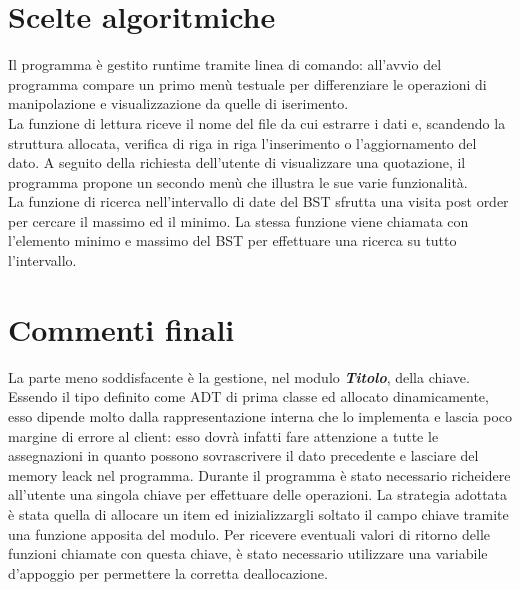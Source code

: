 \documentclass[11pt, a4paper, oneside, titlepage]{article}
\begin{document}
    
    \section{Scelte algoritmiche}
    Il programma è gestito runtime tramite linea di comando: all'avvio del programma compare un primo menù testuale per differenziare le operazioni 
    di manipolazione e visualizzazione da quelle di iserimento.\\
    La funzione di lettura riceve il nome del file da cui estrarre i dati e, scandendo la struttura allocata, verifica di riga in riga l'inserimento o l'aggiornamento del dato.
    A seguito della richiesta dell'utente di visualizzare una quotazione, il programma propone un secondo menù che illustra le sue varie funzionalità.\\
    La funzione di ricerca nell'intervallo di date del BST sfrutta una visita post order per cercare il massimo ed il minimo. 
    La stessa funzione viene chiamata con l'elemento minimo e massimo del BST per effettuare una ricerca su tutto l'intervallo.


    \section{Commenti finali}
    La parte meno soddisfacente è la gestione, nel modulo \textbf{\textit{Titolo}}, della chiave. Essendo il tipo definito come ADT di prima classe ed allocato dinamicamente,
    esso dipende molto dalla rappresentazione interna che lo implementa e lascia poco margine di errore al client: 
    esso dovrà infatti fare attenzione a tutte le assegnazioni in quanto possono sovrascrivere il dato precedente e lasciare del memory leack nel programma.
    Durante il programma è stato necessario richeidere all'utente una singola chiave per effettuare delle operazioni. La strategia adottata è stata quella di allocare un item
    ed inizializzargli soltato il campo chiave tramite una funzione apposita del modulo. Per ricevere eventuali valori di ritorno delle funzioni chiamate con questa chiave, 
    è stato necessario utilizzare una variabile d'appoggio per permettere la corretta deallocazione.


    
\end{document}
